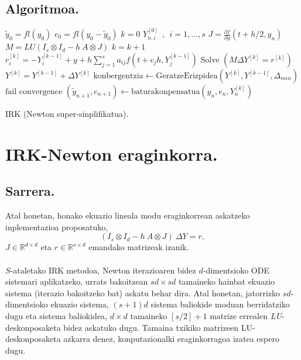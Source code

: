 \subsection*{Algoritmoa.}

\begin{algorithm}[H]
 \BlankLine
  $\tilde{y}_0=fl(y_0)$\;
  $e_0=fl(y_0-\tilde{y}_0)$\;
  {
   \BlankLine
   $k=0$\;
    $Y_{n,i}^{[0]} \ \ , \ \ i=1,\dots,s $\;
   \BlankLine
   $J=\frac{\partial f}{\partial y}(t+h/2,y_n) $\; 
   $M=LU(I_s \otimes I_d - h \ A \otimes J)$\;
   \BlankLine
   {
    \BlankLine 
    $k=k+1$\;
    $r_i^{[k]}=-Y_i^{[k-1]}+y+h \sum\limits_{j=1}^{s} a_{ij} f(t+c_jh,Y_j^{[k-1]}) $\;
    Solve $(M \Delta Y^{[k]}=r^{[k]})$\;
    $Y^{[k]}=Y^{[k-1]}+\Delta Y^{[k]}$\;
    $\text{konbergentzia} \leftarrow \text{GeratzeErizpidea}(Y^{[k]},Y^{[k-1]},\Delta_{min}) $\;
   }
   \BlankLine
   {
     {$\text{fail convergence}$\;}
   }
   {$(\tilde y_{n+1},e_{n+1})\leftarrow \text{baturakonpensatua}(y_n,e_n,Y_n^{[k]})$\;}    
 }
 \caption{IRK (Newton super-sinplifikatua).}
 \label{alg:nss}
\end{algorithm}



\section{IRK-Newton eraginkorra.}
\label{sec:s74}

\subsection*{Sarrera.}

Atal honetan, honako ekuazio lineala modu eraginkorrean askatzeko inplementazioa proposatuko,
\begin{equation*}
(I_s \otimes I_d - h \ A \otimes J) \ \Delta Y = r,
\end{equation*}
$J \in \mathbb{R}^{d \times d}$  eta $r \in \mathbb{R}^{s \times d}$ emandako matrizeak izanik.

\paragraph*{}$S$-ataletako IRK metodoa, Newton iterazioaren bidez $d$-dimentsioko ODE sistemari aplikatzeko, urrats bakoitzean $sd \times sd$ tamaineko hainbat ekuazio sistema (iterazio bakoitzeko bat) askatu behar dira. Atal honetan, jatorrizko $sd$-dimentsioko ekuazio sistema, $(s+1)d$ sistema baliokide moduan berridatziko dugu eta sistema baliokidea,  $d \times d$ tamaineko $[s/2]+1$ matrize errealen \emph{LU}-deskonposaketa bidez askatuko dugu. Tamaina txikiko matrizeen LU-deskonposaketa azkarra denez, konputazionalki eraginkorragoa izatea espero dugu.      

